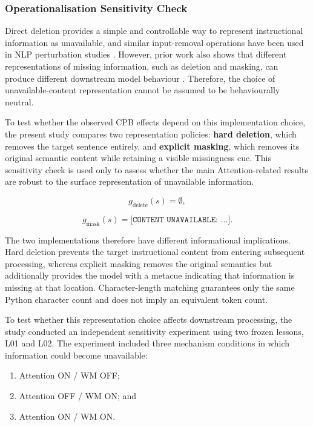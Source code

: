 \subsubsection{Operationalisation Sensitivity Check}
\label{sec:attention-operationalisation-sensitivity}

Direct deletion provides a simple and controllable way to represent instructional information as unavailable, and similar input-removal operations have been used in NLP perturbation studies \cite{feng-etal-2018-pathologies}. However, prior work also shows that different representations of missing information, such as deletion and masking, can produce different downstream model behaviour \cite{lewis-etal-2020-bart}. Therefore, the choice of unavailable-content representation cannot be assumed to be behaviourally neutral.

To test whether the observed CPB effects depend on this implementation choice, the present study compares two representation policies: \textbf{hard deletion}, which removes the target sentence entirely, and \textbf{explicit masking}, which removes its original semantic content while retaining a visible missingness cue. This sensitivity check is used only to assess whether the main Attention-related results are robust to the surface representation of unavailable information.

\[
g_{\mathrm{delete}}(s)=\emptyset,
\]

\[
g_{\mathrm{mask}}(s)
=
\texttt{[CONTENT UNAVAILABLE: ...]}.
\]

The two implementations therefore have different informational implications. Hard deletion prevents the target instructional content from entering subsequent processing, whereas explicit masking removes the original semantics but additionally provides the model with a metacue indicating that information is missing at that location. Character-length matching guarantees only the same Python character count and does not imply an equivalent token count.

To test whether this representation choice affects downstream processing, the study conducted an independent sensitivity experiment using two frozen lessons, L01 and L02. The experiment included three mechanism conditions in which information could become unavailable:

\begin{enumerate}
    \item Attention ON / WM OFF;
    \item Attention OFF / WM ON; and
    \item Attention ON / WM ON.
\end{enumerate}

